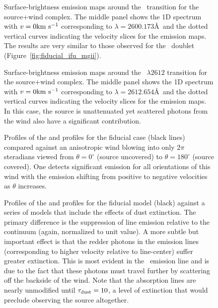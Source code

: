 \documentclass[12pt,preprint]{aastex}
\begin{document}
\begin{figure}
\caption{
Surface-brightness emission maps around the \feiib\ transition for the
source+wind complex.  The middle panel shows the 1D spectrum with $v=0
{\rm km~s^{-1}}$ corresponding to $\lambda = 2600.173$\AA\ and the dotted vertical
curves indicating the velocity slices for the emission maps.  
The results are very similar to those observed for the \mgiid\ doublet
(Figure~\ref{fig:fiducial_ifu_mgii}).
}
\label{fig:fiducial_ifu_feii2600}
\end{figure}

\begin{figure}
\caption{
Surface-brightness emission maps around the ~$\lambda 2612$ transition for the
source+wind complex.  The middle panel shows the 1D spectrum with $v=0
{\rm km~s^{-1}}$ corresponding to $\lambda = 2612.654$\AA\ and the dotted vertical
curves indicating the velocity slices for the emission maps.  
In this case, the source is unattenuated yet scattered photons from
the wind also have a significant contribution. 
}
\label{fig:fiducial_ifu_feii2612}
\end{figure}

\begin{figure}
\caption{
Profiles of the  and  profiles for the fiducial
case (black lines) compared against an anisotropic wind blowing into
only $2\pi$ steradians viewed from $\theta = 0^\circ$ (source
uncovered) to $\theta = 180^\circ$ (source covered).  One detects
significant emission for all orientations of this wind with the
emission shifting from positive to negative velocities as $\theta$
increases.  
}
\label{fig:anisotropic}
\end{figure}

\begin{figure}
\caption{
Profiles of the  and  profiles for the fiducial
model (black) against a series of models that include the effects of
dust extinction.  The primary difference is the suppression of line
emission relative to the continuum (again, normalized to unit value).
A more subtle but important effect is that the redder photons in the
emission lines (corresponding to higher velocity relative to
line-center) suffer greater extinction.  This is most evident in the
\feiic\ emission line and is due to the fact that these photons must
travel further by scattering off the backside of the wind.  Note that
the absorption lines are nearly unmodified until $\tau_{\rm dust} = 10$, a
level of extinction that would preclude observing the source
altogether.
}
\label{fig:dust}
\end{figure}
\end{document}
